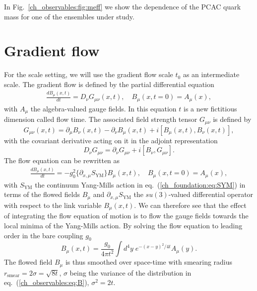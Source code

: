 In Fig.~\ref{ch_observables:fig:meff} we show the dependence of the PCAC quark mass for one of the ensembles under study.


\section{Gradient flow}
\label{ch_observables:sec:Flow}

For the scale setting, we will use the gradient flow scale $t_0$ as an intermediate scale. The gradient flow is defined by the partial differential equation~\citep{Luscher:2010we,1006.4518}
\begin{gather}
\label{ch_observables:eq:flow}
\frac{dB_{\mu}(x,t)}{dt}=D_{\nu}G_{\mu\nu}(x,t), \quad B_{\mu}(x,t=0)=A_{\mu}(x),
\end{gather}
with $A_{\mu}$ the algebra-valued gauge fields. In this equation $t$ is a new fictitious dimension called flow time. The associated field strength tensor $G_{\mu\nu}$ is defined by
\begin{equation}
G_{\mu\nu}(x,t)=\partial_{\mu}B_{\nu}(x,t)-\partial_{\nu}B_{\mu}(x,t)+i\left[B_{\mu}(x,t),B_{\nu}(x,t)\right],
\end{equation}
with the covariant derivative acting on it in the adjoint representation
\begin{equation}
D_{\nu}G_{\mu\nu}=\partial_{\nu}G_{\mu\nu}+i\left[B_{\nu},G_{\mu\nu}\right].
\end{equation}
The flow equation can be rewritten as
\begin{gather}
\frac{dB_{\mu}(x,t)}{dt}=-g_0^2\{\partial_{x,\mu}S_{\textrm{YM}}\}B_{\mu}(x,t), \quad B_{\mu}(x,t=0)=A_{\mu}(x),
\end{gather}
with $S_{\textrm{YM}}$ the continuum Yang-Mills action in eq.~(\ref{ch_foundation:eq:SYM}) in terms of the flowed fields $B_{\mu}$ and $\partial_{x,\mu}S_{\textrm{YM}}$ the $su(3)$-valued differential operator with respect to the link variable $B_{\mu}(x,t)$. We can therefore see that the effect of integrating the flow equation of motion is to flow the gauge fields towards the local minima of the Yang-Mills action. By solving the flow equation to leading order in the bare coupling $g_0$
\begin{equation}
\label{ch_observables:eq:B}
B_{\mu}(x,t)=\frac{g_0}{4\pi t^2}\int d^4y\;e^{-(x-y)^2/4t}A_{\mu}(y).
\end{equation}
The flowed field $B_{\mu}$ is thus smoothed over space-time with smearing radius $r_{\textrm{smear}}=2\sigma=\sqrt{8t}$, $\sigma$ being the variance of the distribution in eq.~(\ref{ch_observables:eq:B}), $\sigma^2=2t$.

